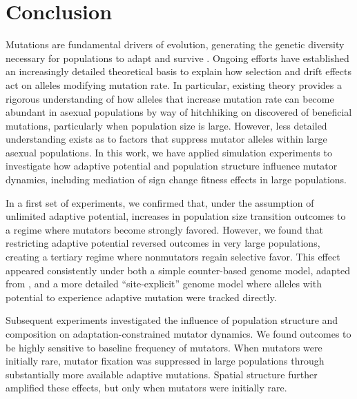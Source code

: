 \section{Conclusion} \label{sec:conclusion}


Mutations are fundamental drivers of evolution, generating the genetic diversity necessary for populations to adapt and survive \citep{hershberg2015mutation}.
Ongoing efforts have established an increasingly detailed theoretical basis to explain how selection and drift effects act on alleles modifying mutation rate.
In particular, existing theory provides a rigorous understanding of how alleles that increase mutation rate can become abundant in asexual populations by way of hitchhiking on discovered of beneficial mutations, particularly when population size is large.
However, less detailed understanding exists as to factors that suppress mutator alleles within large asexual populations.
In this work, we have applied simulation experiments to investigate how adaptive potential and population structure influence mutator dynamics, including mediation of sign change fitness effects in large populations.

In a first set of experiments, we confirmed that, under the assumption of unlimited adaptive potential, increases in population size transition outcomes to a regime where mutators become strongly favored.
However, we found that restricting adaptive potential reversed outcomes in very large populations, creating a tertiary regime where nonmutators regain selective favor.
This effect appeared consistently under both a simple counter-based genome model, adapted from \citet{raynes2018sign}, and a more detailed ``site-explicit'' genome model where alleles with potential to experience adaptive mutation were tracked directly.

Subsequent experiments investigated the influence of population structure and composition on adaptation-constrained mutator dynamics.
We found outcomes to be highly sensitive to baseline frequency of mutators.
When mutators were initially rare, mutator fixation was suppressed in large populations through substantially more available adaptive mutations.
Spatial structure further amplified these effects, but only when mutators were initially rare.

